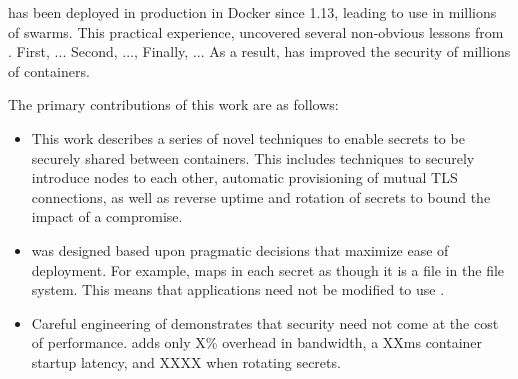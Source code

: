 \sysname has been deployed in production in Docker since 1.13, leading to 
use in millions of swarms.  This practical experience, uncovered several
non-obvious lessons from \sysname.  First, ...   Second, ..., Finally, ...
As a result, \sysname has improved the security of millions of containers.


The primary contributions of this work are as follows:

\begin{itemize}

\item This work describes a series of novel techniques to enable secrets to
be securely shared between containers.  This includes techniques to
securely introduce nodes to each other, automatic provisioning of mutual
TLS connections, as well as reverse uptime and rotation of secrets to bound 
the impact of a compromise.

\item \sysname was designed based upon pragmatic decisions that maximize 
ease of deployment.  For example, \sysname maps in each secret
as though it is a file in the file system.  This means that applications
need not be modified to use \sysname.  

\item Careful engineering of \sysname demonstrates that security need not
come at the cost of performance.  \sysname adds only X\% overhead in 
bandwidth, a XXms container startup latency, and XXXX when rotating
secrets.


\end{itemize}



